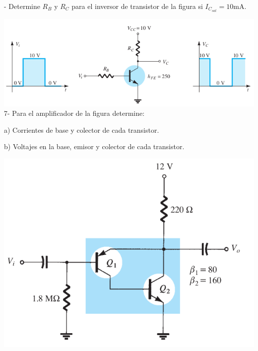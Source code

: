\documentclass[10pt,letterpaper]{article}
\begin{document}
	 - Determine $R_B$ y $R_C$ para el inversor de transistor de la figura si $I_{C_{sat}} = 10 \mathrm{mA}$.
	
		\includegraphics[scale=0.7]{c6.png} \\
	
	7- Para el amplificador de la figura determine:
	
	a) Corrientes de base y colector de cada transistor.
	
	b) Voltajes en la base, emisor y colector de cada transistor.
	
	\includegraphics[scale=0.5]{c7.png}
\end{document}
